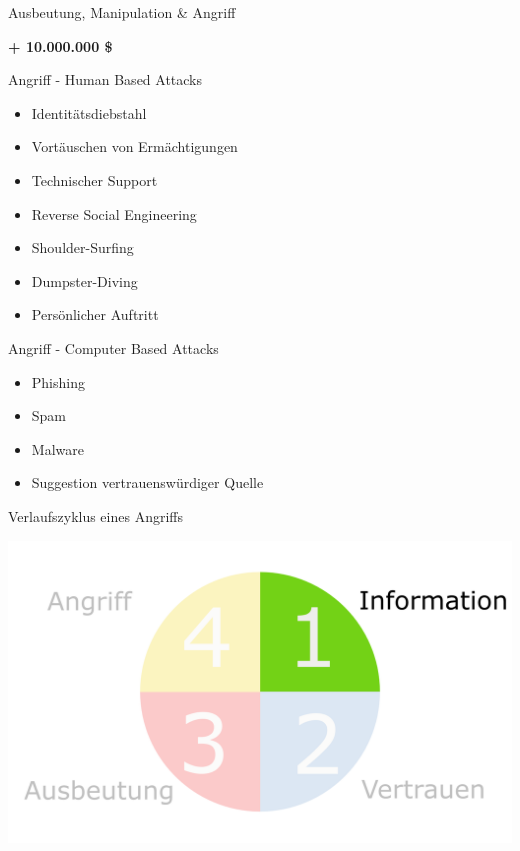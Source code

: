 \documentclass[11pt]{beamer}
\begin{document}
\begin{frame}{Ausbeutung, Manipulation \& Angriff}
  \begin{center}
  {\Huge \textbf{+ 10.000.000 \$}}
  \end{center}
\end{frame}

\begin{frame}{Angriff - Human Based Attacks}
  \begin{itemize}
    \item Identitätsdiebstahl
    \item Vortäuschen von Ermächtigungen
    \item Technischer Support
    \item Reverse Social Engineering
    \item Shoulder-Surfing
    \item Dumpster-Diving
    \item Persönlicher Auftritt
  \end{itemize}
\end{frame}

\begin{frame}{Angriff - Computer Based Attacks}
  \begin{itemize}
    \item Phishing
    \item Spam
    \item Malware
    \item Suggestion vertrauenswürdiger Quelle
  \end{itemize}
\end{frame}

\begin{frame}[t]{Verlaufszyklus eines Angriffs}
  \begin{center}
    \includegraphics[height=0.75\textheight]{cycle2}
  \end{center}
\end{frame}
\end{document}

